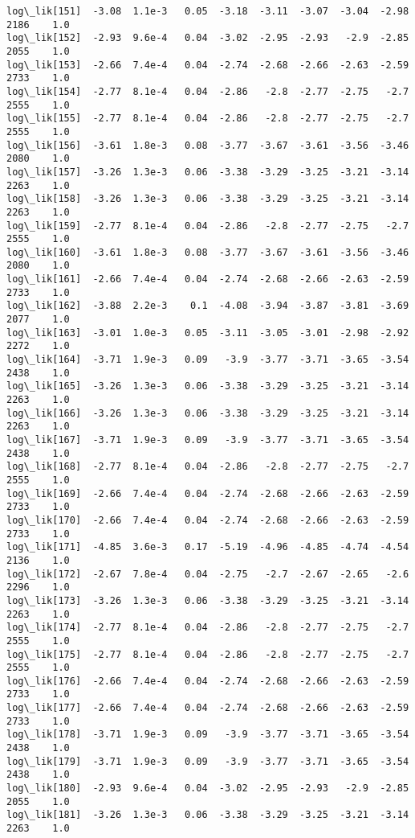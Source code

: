 \documentclass[11pt]{article}
\begin{document}
\begin{Verbatim}[commandchars=\\\{\}]
log\_lik[151]  -3.08  1.1e-3   0.05  -3.18  -3.11  -3.07  -3.04  -2.98   2186    1.0
log\_lik[152]  -2.93  9.6e-4   0.04  -3.02  -2.95  -2.93   -2.9  -2.85   2055    1.0
log\_lik[153]  -2.66  7.4e-4   0.04  -2.74  -2.68  -2.66  -2.63  -2.59   2733    1.0
log\_lik[154]  -2.77  8.1e-4   0.04  -2.86   -2.8  -2.77  -2.75   -2.7   2555    1.0
log\_lik[155]  -2.77  8.1e-4   0.04  -2.86   -2.8  -2.77  -2.75   -2.7   2555    1.0
log\_lik[156]  -3.61  1.8e-3   0.08  -3.77  -3.67  -3.61  -3.56  -3.46   2080    1.0
log\_lik[157]  -3.26  1.3e-3   0.06  -3.38  -3.29  -3.25  -3.21  -3.14   2263    1.0
log\_lik[158]  -3.26  1.3e-3   0.06  -3.38  -3.29  -3.25  -3.21  -3.14   2263    1.0
log\_lik[159]  -2.77  8.1e-4   0.04  -2.86   -2.8  -2.77  -2.75   -2.7   2555    1.0
log\_lik[160]  -3.61  1.8e-3   0.08  -3.77  -3.67  -3.61  -3.56  -3.46   2080    1.0
log\_lik[161]  -2.66  7.4e-4   0.04  -2.74  -2.68  -2.66  -2.63  -2.59   2733    1.0
log\_lik[162]  -3.88  2.2e-3    0.1  -4.08  -3.94  -3.87  -3.81  -3.69   2077    1.0
log\_lik[163]  -3.01  1.0e-3   0.05  -3.11  -3.05  -3.01  -2.98  -2.92   2272    1.0
log\_lik[164]  -3.71  1.9e-3   0.09   -3.9  -3.77  -3.71  -3.65  -3.54   2438    1.0
log\_lik[165]  -3.26  1.3e-3   0.06  -3.38  -3.29  -3.25  -3.21  -3.14   2263    1.0
log\_lik[166]  -3.26  1.3e-3   0.06  -3.38  -3.29  -3.25  -3.21  -3.14   2263    1.0
log\_lik[167]  -3.71  1.9e-3   0.09   -3.9  -3.77  -3.71  -3.65  -3.54   2438    1.0
log\_lik[168]  -2.77  8.1e-4   0.04  -2.86   -2.8  -2.77  -2.75   -2.7   2555    1.0
log\_lik[169]  -2.66  7.4e-4   0.04  -2.74  -2.68  -2.66  -2.63  -2.59   2733    1.0
log\_lik[170]  -2.66  7.4e-4   0.04  -2.74  -2.68  -2.66  -2.63  -2.59   2733    1.0
log\_lik[171]  -4.85  3.6e-3   0.17  -5.19  -4.96  -4.85  -4.74  -4.54   2136    1.0
log\_lik[172]  -2.67  7.8e-4   0.04  -2.75   -2.7  -2.67  -2.65   -2.6   2296    1.0
log\_lik[173]  -3.26  1.3e-3   0.06  -3.38  -3.29  -3.25  -3.21  -3.14   2263    1.0
log\_lik[174]  -2.77  8.1e-4   0.04  -2.86   -2.8  -2.77  -2.75   -2.7   2555    1.0
log\_lik[175]  -2.77  8.1e-4   0.04  -2.86   -2.8  -2.77  -2.75   -2.7   2555    1.0
log\_lik[176]  -2.66  7.4e-4   0.04  -2.74  -2.68  -2.66  -2.63  -2.59   2733    1.0
log\_lik[177]  -2.66  7.4e-4   0.04  -2.74  -2.68  -2.66  -2.63  -2.59   2733    1.0
log\_lik[178]  -3.71  1.9e-3   0.09   -3.9  -3.77  -3.71  -3.65  -3.54   2438    1.0
log\_lik[179]  -3.71  1.9e-3   0.09   -3.9  -3.77  -3.71  -3.65  -3.54   2438    1.0
log\_lik[180]  -2.93  9.6e-4   0.04  -3.02  -2.95  -2.93   -2.9  -2.85   2055    1.0
log\_lik[181]  -3.26  1.3e-3   0.06  -3.38  -3.29  -3.25  -3.21  -3.14   2263    1.0

\end{Verbatim}
\end{document}
